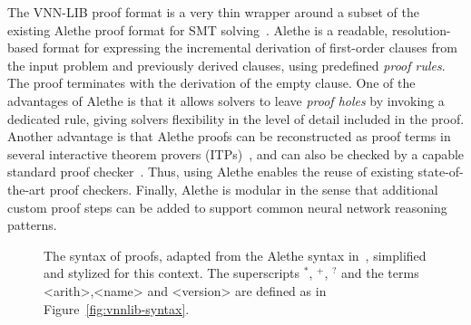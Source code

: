 The VNN-LIB proof format is a very thin wrapper around a subset of the existing Alethe proof format for SMT solving~\cite{ScFlBaFo21}. Alethe is a readable, resolution-based format for expressing the incremental derivation of first-order clauses from the input problem and previously derived clauses, using predefined \emph{proof rules}. The proof terminates with the derivation of the empty clause. One of the advantages of Alethe is that it allows solvers to leave \emph{proof holes} by invoking a dedicated rule, giving solvers flexibility in the level of detail included in the proof.
Another advantage is that Alethe proofs can be reconstructed as proof terms in several interactive theorem provers (ITPs)~\cite{LaFlBaJaAnReScBaTi25,EkMeTiKeKaReBa17,CoAnBaDoMe24}, and can also be checked by a capable standard proof checker~\cite{AnLaBa23}. Thus, using Alethe enables the reuse of existing state-of-the-art proof checkers. Finally, Alethe is modular in the sense that additional custom proof steps can be added to support common neural network reasoning patterns.


\begin{figure}[p]
	\setlength{\grammarindent}{6.5em}
	\vspace{-0.8cm}
	
	\vspace{-1em}
    \caption{The syntax of \vnnlib{} proofs, adapted from the Alethe syntax in~\cite{ScFlBaFo21}, simplified and stylized for this context. The superscripts $^*$, $^+$, $^?$ and the terms <arith>,<name> and <version> are defined as in Figure~\ref{fig:vnnlib-syntax}.}
    \label{fig:proof-syntax}
\end{figure}

